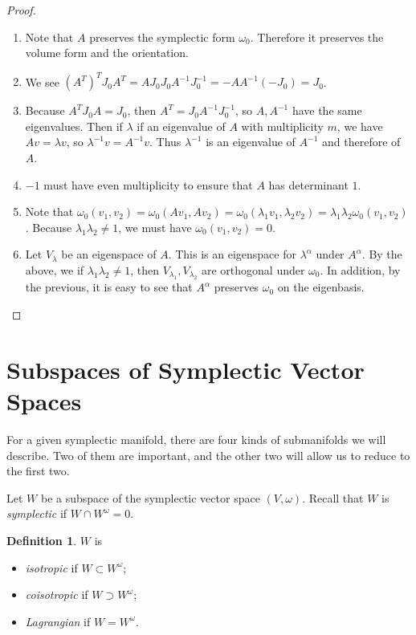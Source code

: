 \documentclass[leqno, openany]{memoir}
\theoremstyle{definition}
\newtheorem{defn}[thm]{Definition}
\theoremstyle{remark}
\theoremstyle{plain}
\theoremstyle{definition}
\theoremstyle{remark}
\begin{document}
\begin{proof}
    \begin{enumerate}
        \item Note that $A$ preserves the symplectic form $\omega_0$. Therefore it preserves the volume form and the orientation.
        \item We see $(A^T)^T J_0 A^T = A J_0 J_0 A^{-1}J_0^{-1} = -AA^{-1}(-J_0) = J_0$.
        \item Because $A^T J_0 A = J_0$, then $A^T = J_0 A^{-1} J_0^{-1}$, so $A, A^{-1}$ have the same eigenvalues. Then if $\lambda$ if an eigenvalue of $A$ with multiplicity $m$, we have $Av = \lambda v$, so $\lambda^{-1}v = A^{-1}v$. Thus $\lambda^{-1}$ is an eigenvalue of $A^{-1}$ and therefore of $A$.
        \item $-1$ must have even multiplicity to ensure that $A$ has determinant $1$.
        \item Note that $\omega_0(v_1, v_2) = \omega_0(Av_1, Av_2) = \omega_0(\lambda_1 v_1, \lambda_2 v_2) = \lambda_1 \lambda_2 \omega_0(v_1, v_2)$. Because $\lambda_1 \lambda_2 \neq 1$, we must have $\omega_0(v_1, v_2) = 0$.
        \item Let $V_{\lambda}$ be an eigenspace of $A$. This is an eigenspace for $\lambda^{\alpha}$ under $A^{\alpha}$. By the above, we if $\lambda_1 \lambda_2 \neq 1$, then $V_{\lambda_1}, V_{\lambda_2}$ are orthogonal under $\omega_0$. In addition, by the previous, it is easy to see that $A^{\alpha}$ preserves $\omega_0$ on the eigenbasis. \qedhere
    \end{enumerate}
\end{proof}

\section{Subspaces of Symplectic Vector Spaces}%
\label{sec:subspaces_of_symplectic_vector_spaces}

For a given symplectic manifold, there are four kinds of submanifolds we will describe. Two of them are important, and the other two will allow us to reduce to the first two.

Let $W$ be a subspace of the symplectic vector space $(V, \omega)$. Recall that $W$ is \textit{symplectic} if $W \cap W^{\omega} = 0$.

\begin{defn}
    $W$ is 
    \begin{itemize}
        \item \textit{isotropic} if $W \subset W^{\omega}$;
        \item \textit{coisotropic} if $W \supset W^{\omega}$;
        \item \textit{Lagrangian} if $W = W^{\omega}$.
    \end{itemize}
\end{defn}
\end{document}
